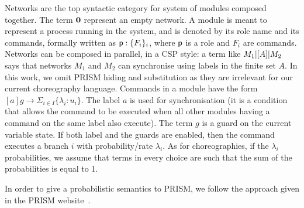 Networks are the top syntactic category for system of modules composed
together. The term $\mathbf{0}$ represent an empty network. A module is
meant to represent a process running in the system, and is denoted by
its role name and its commands, formally written as
$\mathsf{p}:\{F_i\}_i$, where $\mathsf{p}$ is a role and $F_i$ are
commands. Networks can be composed in parallel, in a CSP style: a term
like $M_1 |[A]| M_2$ says that networks $M_1$ and $M_2$ can
synchronise using labels in the finite set $A$.
%
In this work, we omit PRISM hiding and substitution as they are
irrelevant for our current choreography language.
%
Commands in a module have the form
$[a] g \rightarrow \Sigma_{i\in I}\{\lambda_i: u_i\}$. The label $a$
is used for synchronisation (it is a condition that allows the command
to be executed when all other modules having a command on the same
label also execute).  The term $g$ is a guard on the current variable
state. If both label and the guards are enabled, then the command
executes a branch $i$ with probability/rate $\lambda_i$. As for
choreographies, if the $\lambda_i$ probabilities, we assume that terms
in every choice are such that the sum of the probabilities is equal to
1.

 In order to give a probabilistic semantics to
PRISM, we follow the approach given in the PRISM
website~\cite{prismemantics}. 
%


